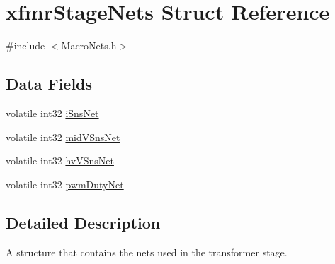 \hypertarget{a00009}{\section{xfmr\-Stage\-Nets Struct Reference}
\label{a00009}
}


{\ttfamily \#include $<$Macro\-Nets.\-h$>$}

\subsection*{Data Fields}
\begin{DoxyCompactItemize}
\item 
volatile int32 \hyperlink{a00009_a794dc3b0f07e245bb54f830d86ad8fed}{i\-Sns\-Net}
\item 
volatile int32 \hyperlink{a00009_a6cf2860aba64beca1c5471fcc7432c07}{mid\-V\-Sns\-Net}
\item 
volatile int32 \hyperlink{a00009_af673ad18a7fbfd829202293dd019d25b}{hv\-V\-Sns\-Net}
\item 
volatile int32 \hyperlink{a00009_a0c842e8cc854cd6665110f4ade15514f}{pwm\-Duty\-Net}
\end{DoxyCompactItemize}


\subsection{Detailed Description}
A structure that contains the nets used in the transformer stage. 

